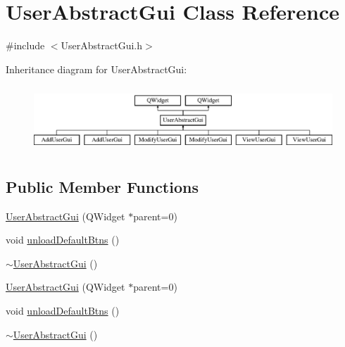 \hypertarget{class_user_abstract_gui}{\section{User\-Abstract\-Gui Class Reference}
\label{class_user_abstract_gui}
}


{\ttfamily \#include $<$User\-Abstract\-Gui.\-h$>$}

Inheritance diagram for User\-Abstract\-Gui\-:\begin{figure}[H]
\begin{center}
\leavevmode
\includegraphics[height=2.500000cm]{class_user_abstract_gui}
\end{center}
\end{figure}
\subsection*{Public Member Functions}
\begin{DoxyCompactItemize}
\item 
\hyperlink{class_user_abstract_gui_a9f2da6d8685ebb5d5b89b4a2f5ff7a07}{User\-Abstract\-Gui} (Q\-Widget $\ast$parent=0)
\item 
void \hyperlink{class_user_abstract_gui_aa70c83fc9085be1f2f1db3cfe751540e}{unload\-Default\-Btns} ()
\item 
\hyperlink{class_user_abstract_gui_a8a42dbd2b36a98a2718f22d92aa26c6e}{$\sim$\-User\-Abstract\-Gui} ()
\item 
\hyperlink{class_user_abstract_gui_a9f2da6d8685ebb5d5b89b4a2f5ff7a07}{User\-Abstract\-Gui} (Q\-Widget $\ast$parent=0)
\item 
void \hyperlink{class_user_abstract_gui_aa70c83fc9085be1f2f1db3cfe751540e}{unload\-Default\-Btns} ()
\item 
\hyperlink{class_user_abstract_gui_a8a42dbd2b36a98a2718f22d92aa26c6e}{$\sim$\-User\-Abstract\-Gui} ()
\end{DoxyCompactItemize}
